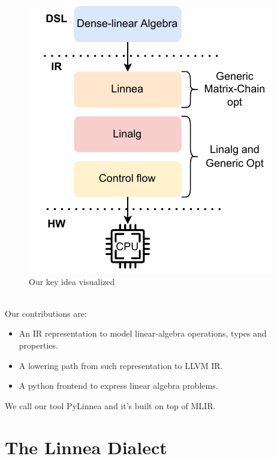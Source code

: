 \documentclass[conference]{IEEEtran}
\begin{document}
\begin{figure}
%
\includegraphics[width=\columnwidth]{images/Impact2022.drawio.pdf}
\caption{Our key idea visualized}
\end{figure}

~\\
Our contributions are:

\begin{itemize}
	\item An IR representation to model linear-algebra operations, types and properties.
	\item A lowering path from such representation to LLVM IR.
  \item A python frontend to express linear algebra problems.
\end{itemize}

We call our tool PyLinnea and it's built on top of MLIR.

\section{The Linnea Dialect}
\end{document}
